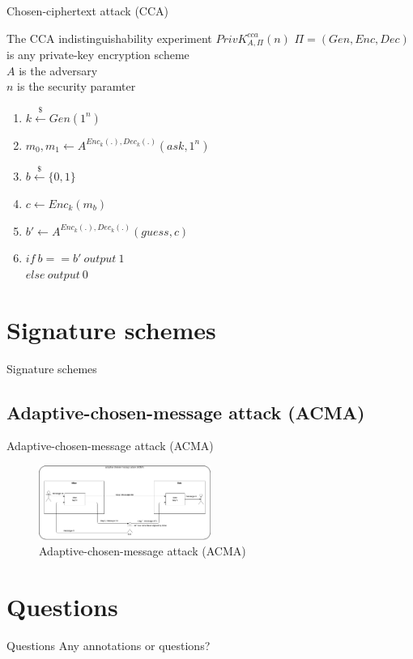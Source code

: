 \documentclass[ucs,9pt]{beamer}
\begin{document}
\begin{frame}{Chosen-ciphertext attack (CCA)}
    \begin{block}{The CCA indistinguishability experiment $ PrivK_{A,\Pi}^{cca}(n) $}
        $\Pi = (Gen, Enc, Dec)$ is any private-key encryption scheme\\
        $A$ is the adversary\\
        $n$ is the security paramter\\
        \begin{enumerate}
            \item $ k \overset{\$}{\leftarrow} Gen(1^n) $
            \item $ m_{0}, m_{1} \leftarrow A^{Enc_{k}(.), Dec_{k}(.)}(ask, 1^{n}) $
            \item $ b \overset{\$}{\leftarrow} \{0, 1\} $
            \item $ c \leftarrow Enc_{k}(m_{b}) $
            \item $ b' \leftarrow A^{Enc_{k}(.), Dec_{k}(.)}(guess, c) $
            \item $ if\ b == b'\ output\ 1 $ \\
            $ else\ output\ 0 $
        \end{enumerate}
    \end{block}
\end{frame}

\section{Signature schemes}
\begin{frame}
    \centering
    \huge{Signature schemes}
\end{frame}

\subsection{Adaptive-chosen-message attack (ACMA)}

\begin{frame}{Adaptive-chosen-message attack (ACMA)}
    \begin{figure}[h]
        \centering
        \includegraphics[width=0.5\textwidth]{figures/ACMA.png}
        \caption{Adaptive-chosen-message attack (ACMA)}
    \end{figure}
\end{frame}


\section*{Questions}

\begin{frame}{Questions}
    \huge{Any annotations or questions?}
\end{frame}
\end{document}
